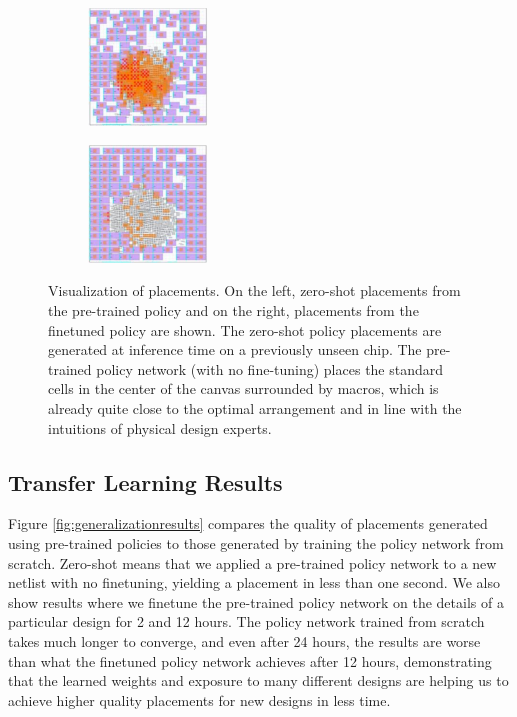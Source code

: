 \documentclass{article}
\begin{document}
\begin{figure}[ht]
     \centering
     \begin{subfigure}
        \centering
        \includegraphics[width=0.35\textwidth]{zeroshot-visualization-c.pdf}
     \end{subfigure}
     \begin{subfigure}
        \centering
        \includegraphics[width=0.35\textwidth]{finetuned-visualization-c.pdf}
     \end{subfigure}
        \caption{Visualization of placements. On the left, zero-shot placements from the pre-trained policy and on the right, placements from the finetuned policy are shown. The zero-shot policy placements are generated at inference time on a previously unseen chip. The pre-trained policy network (with no fine-tuning) places the standard cells in the center of the canvas surrounded by macros, which is already quite close to the optimal arrangement and in line with the intuitions of physical design experts.}
        \label{fig:zeroshot-vs-finetuned}
\end{figure}


\subsection{Transfer Learning Results}

Figure \ref{fig:generalizationresults} compares the quality of placements generated using pre-trained policies to those generated by training the policy network from scratch. Zero-shot means that we applied a pre-trained policy network to a new netlist with no finetuning, yielding a placement in less than one second. We also show results where we finetune the pre-trained policy network on the details of a particular design for 2 and 12 hours. The policy network trained from scratch takes much longer to converge, and even after 24 hours, the results are worse than what the finetuned policy network achieves after 12 hours, demonstrating that the learned weights and exposure to many different designs are helping us to achieve higher quality placements for new designs in less time.  
\end{document}
